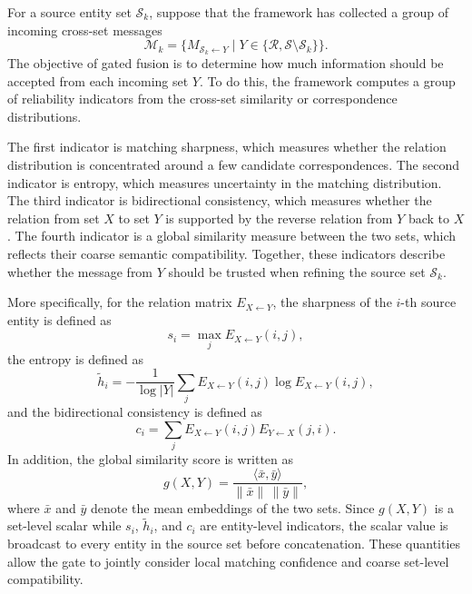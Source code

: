 For a source entity set \(\mathcal{S}_k\), suppose that the framework has collected a group of incoming cross-set messages
\begin{equation}
  \mathcal{M}_k = \{M_{\mathcal{S}_k \leftarrow Y} \mid Y \in \{\mathcal{R}, \mathcal{S}\setminus \mathcal{S}_k\}\}.
\end{equation}
The objective of gated fusion is to determine how much information should be accepted from each incoming set \(Y\). To do this, the framework computes a group of reliability indicators from the cross-set similarity or correspondence distributions.

The first indicator is matching sharpness, which measures whether the relation distribution is concentrated around a few candidate correspondences. The second indicator is entropy, which measures uncertainty in the matching distribution. The third indicator is bidirectional consistency, which measures whether the relation from set \(X\) to set \(Y\) is supported by the reverse relation from \(Y\) back to \(X\). The fourth indicator is a global similarity measure between the two sets, which reflects their coarse semantic compatibility. Together, these indicators describe whether the message from \(Y\) should be trusted when refining the source set \(\mathcal{S}_k\).

More specifically, for the relation matrix \(E_{X \leftarrow Y}\), the sharpness of the \(i\)-th source entity is defined as
\begin{equation}
  s_i = \max_j E_{X \leftarrow Y}(i,j),
\end{equation}
the entropy is defined as
\begin{equation}
  \tilde{h}_i
  =
  - \frac{1}{\log |Y|}
  \sum_j E_{X \leftarrow Y}(i,j)\log E_{X \leftarrow Y}(i,j),
\end{equation}
and the bidirectional consistency is defined as
\begin{equation}
  c_i = \sum_j E_{X \leftarrow Y}(i,j) E_{Y \leftarrow X}(j,i).
\end{equation}
In addition, the global similarity score is written as
\begin{equation}
  g(X,Y) = \frac{\langle \bar{x},\bar{y} \rangle}{\|\bar{x}\|\,\|\bar{y}\|},
\end{equation}
where \(\bar{x}\) and \(\bar{y}\) denote the mean embeddings of the two sets. Since \(g(X,Y)\) is a set-level scalar while \(s_i\), \(\tilde{h}_i\), and \(c_i\) are entity-level indicators, the scalar value is broadcast to every entity in the source set before concatenation. These quantities allow the gate to jointly consider local matching confidence and coarse set-level compatibility.

